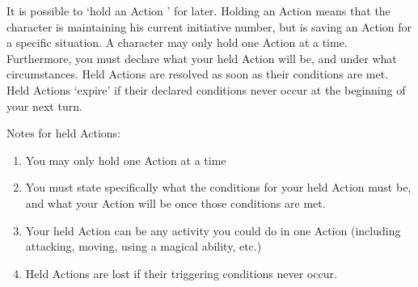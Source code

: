 \documentclass[twoside]{book}
\begin{document}
   It is possible to `hold an Action ' for
             later. Holding an Action means that the character is
             maintaining his current initiative number, but is saving an
             Action for a specific situation. A character may only hold
             one Action at a time. Furthermore, you must declare what
             your held Action will be, and under what circumstances. Held
             Actions are resolved as soon as their conditions are met.
             Held Actions `expire' if their declared
             conditions never occur at the beginning of your next turn.
             
  

  

   Notes for held Actions: 
\begin{enumerate}
      
  \item   
                You may only hold one Action at a time   
            
  \item   
                  You must state specifically what the conditions
                 for your held Action must be, and what your Action will
                 be once those conditions are met. 
            
  \item   
                  Your held Action can be any activity you could do
                 in one Action (including attacking, moving, using a
                 magical ability, etc.) 
            
  \item   
                  Held Actions are lost if their triggering
                 conditions never occur. 
            
\end{enumerate}
  
\end{document}
